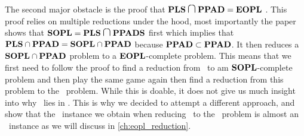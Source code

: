 The second major obstacle is the proof that $\PLS \medcap \PPAD = \EOPL$ . This proof relies on multiple reductions under the hood, most importantly the paper shows that $\SOPL = \PLS \medcap \PPADS$ first which implies that $\textbf{PLS} \cap \textbf{PPAD} =  \textbf{SOPL} \cap \textbf{PPAD}$ because $\textbf{PPAD} \subset \textbf{PPAD}$. It then reduces a $\textbf{SOPL} \cap \textbf{PPAD}$ problem to a $\textbf{EOPL}$-complete problem. This means that we first need to follow the proof to find a reduction from \Tarskistar\ to am $\textbf{SOPL}$-complete problem and then play the same game again then find a reduction from this problem to the \EndOfPotentialLine\ problem. While this is doable, it does not give us much insight into why \Tarski\ lies in \EOPL. This is why we decided to attempt a different approach, and show that the \EndOfLine\ instance we obtain when reducing \Tarskistar\ to the \EndOfLine\ problem is almost an \EndOfPotentialLine\ instance as we will discuss in \cref{ch:eopl_reduction}.